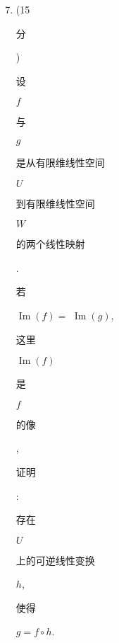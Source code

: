 \documentclass[10pt]{article}
\begin{document}
\begin{enumerate}
  \setcounter{enumi}{6}
  \item (15 \begin{CJK}{UTF8}{mj}分\end{CJK}) \begin{CJK}{UTF8}{mj}设\end{CJK} $f$ \begin{CJK}{UTF8}{mj}与\end{CJK} $g$ \begin{CJK}{UTF8}{mj}是从有限维线性空间\end{CJK} $U$ \begin{CJK}{UTF8}{mj}到有限维线性空间\end{CJK} $W$ \begin{CJK}{UTF8}{mj}的两个线性映射\end{CJK}. \begin{CJK}{UTF8}{mj}若\end{CJK} $\operatorname{Im}(f)=$ $\operatorname{Im}(g)$, \begin{CJK}{UTF8}{mj}这里\end{CJK} $\operatorname{Im}(f)$ \begin{CJK}{UTF8}{mj}是\end{CJK} $f$ \begin{CJK}{UTF8}{mj}的像\end{CJK}, \begin{CJK}{UTF8}{mj}证明\end{CJK}: \begin{CJK}{UTF8}{mj}存在\end{CJK} $U$ \begin{CJK}{UTF8}{mj}上的可逆线性变换\end{CJK} $h$, \begin{CJK}{UTF8}{mj}使得\end{CJK} $g=f \circ h$.


\end{enumerate}
\end{document}
